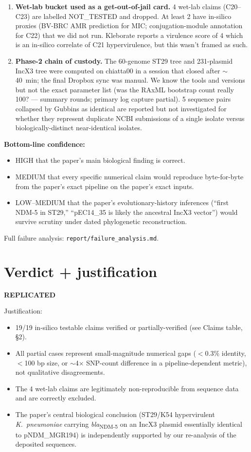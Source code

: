 \documentclass[11pt,letterpaper]{article}
\newcommand{\vok}{\textcolor{green!50!black}{\checkmark}}
\begin{document}
\begin{enumerate}
\item \textbf{Wet-lab bucket used as a get-out-of-jail card.} 4 wet-lab claims (C20--C23) are labelled NOT\_TESTED and dropped. At least 2 have in-silico proxies (BV-BRC AMR prediction for MIC; conjugation-module annotation for C22) that we did not run. Kleborate reports a virulence score of 4 which is an in-silico correlate of C21 hypervirulence, but this wasn't framed as such.

\item \textbf{Phase-2 chain of custody.} The 60-genome ST29 tree and 231-plasmid IncX3 tree were computed on chiatta00 in a session that closed after $\sim$40~min; the final Dropbox sync was manual. We know the tools and versions but not the exact parameter list (was the RAxML bootstrap count really 100? --- summary rounds; primary log capture partial). 5 sequence pairs collapsed by Gubbins as identical are reported but not investigated for whether they represent duplicate NCBI submissions of a single isolate versus biologically-distinct near-identical isolates.
\end{enumerate}

\textbf{Bottom-line confidence:}
\begin{itemize}[nosep]
\item HIGH that the paper's main biological finding is correct.
\item MEDIUM that every specific numerical claim would reproduce byte-for-byte from the paper's exact pipeline on the paper's exact inputs.
\item LOW--MEDIUM that the paper's evolutionary-history inferences (``first NDM-5 in ST29,'' ``pEC14\_35 is likely the ancestral IncX3 vector'') would survive scrutiny under dated phylogenetic reconstruction.
\end{itemize}

Full failure analysis: \texttt{report/failure\_analysis.md}.

\section{Verdict + justification}

\textbf{REPLICATED} \vok{}

Justification:
\begin{itemize}[nosep]
\item 19/19 in-silico testable claims verified or partially-verified (see Claims table, \S2).
\item All partial cases represent small-magnitude numerical gaps ($<$0.3\% identity, $<$100 bp size, or $\sim$4$\times$ SNP-count difference in a pipeline-dependent metric), not qualitative disagreements.
\item The 4 wet-lab claims are legitimately non-reproducible from sequence data and are correctly excluded.
\item The paper's central biological conclusion (ST29/K54 hypervirulent \textit{K.\ pneumoniae} carrying \textit{bla}\textsubscript{NDM-5} on an IncX3 plasmid essentially identical to pNDM\_MGR194) is independently supported by our re-analysis of the deposited sequences.
\end{itemize}
\end{document}
